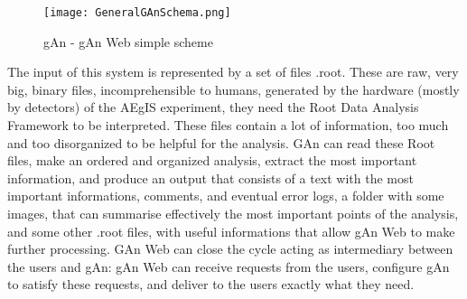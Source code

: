 \begin{figure}[H]
\centering
\texttt{[image: GeneralGAnSchema.png]} 
\caption{gAn - gAn Web simple scheme}
\end{figure}

The input of this system is represented by a set of files .root. These are raw, very big, binary files, incomprehensible to humans, generated by the hardware (mostly by detectors) of the AEgIS experiment, they need the Root Data Analysis Framework to be interpreted. These files contain a lot of information, too much and too disorganized to be helpful for the analysis. GAn can read these Root files, make an ordered and organized analysis, extract the most important information, and produce an output that consists of a text with the most important informations, comments, and eventual error logs, a folder with some images, that can summarise effectively the most important points of the analysis, and some other .root files, with useful informations that allow gAn Web to make further processing. GAn Web can close the cycle acting as intermediary between the users and gAn: gAn Web can receive requests from the users, configure gAn to satisfy these requests, and deliver to the users exactly what they need.


